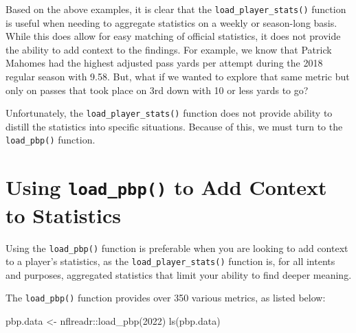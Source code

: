 \documentclass[
  letterpaper,
]{krantz}
\newenvironment{Shaded}{\begin{snugshade}}{\end{snugshade}}
\newcommand{\DecValTok}[1]{\textcolor[rgb]{0.68,0.00,0.00}{#1}}
\newcommand{\FunctionTok}[1]{\textcolor[rgb]{0.28,0.35,0.67}{#1}}
\newcommand{\NormalTok}[1]{\textcolor[rgb]{0.00,0.23,0.31}{#1}}
\newcommand{\OtherTok}[1]{\textcolor[rgb]{0.00,0.23,0.31}{#1}}
\newcommand{\SpecialCharTok}[1]{\textcolor[rgb]{0.37,0.37,0.37}{#1}}
\begin{document}
Based on the above examples, it is clear that the
\texttt{load\_player\_stats()} function is useful when needing to
aggregate statistics on a weekly or season-long basis. While this does
allow for easy matching of official statistics, it does not provide the
ability to add context to the findings. For example, we know that
Patrick Mahomes had the highest adjusted pass yards per attempt during
the 2018 regular season with 9.58. But, what if we wanted to explore
that same metric but only on passes that took place on 3rd down with 10
or less yards to go?

Unfortunately, the \texttt{load\_player\_stats()} function does not
provide ability to distill the statistics into specific situations.
Because of this, we must turn to the \texttt{load\_pbp()} function.

\hypertarget{using-load_pbp-to-add-context-to-statistics}{%
\section{\texorpdfstring{Using \texttt{load\_pbp()} to Add Context to
Statistics}{Using load\_pbp() to Add Context to Statistics}}\label{using-load_pbp-to-add-context-to-statistics}}

Using the \texttt{load\_pbp()} function is preferable when you are
looking to add context to a player's statistics, as the
\texttt{load\_player\_stats()} function is, for all intents and
purposes, aggregated statistics that limit your ability to find deeper
meaning.

The \texttt{load\_pbp()} function provides over 350 various metrics, as
listed below:

\begin{Shaded}
\begin{Highlighting}[]
\NormalTok{pbp.data }\OtherTok{\textless{}{-}}\NormalTok{ nflreadr}\SpecialCharTok{::}\FunctionTok{load\_pbp}\NormalTok{(}\DecValTok{2022}\NormalTok{)}
\FunctionTok{ls}\NormalTok{(pbp.data)}
\end{Highlighting}
\end{Shaded}
\end{document}
